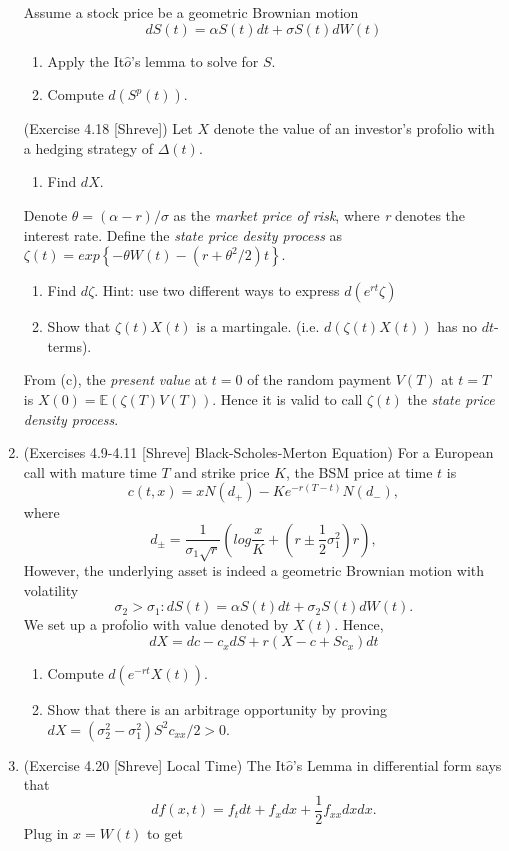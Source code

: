 \documentclass{article}
\begin{document}
\begin{enumerate}
Assume a stock price be a geometric Brownian motion \[dS(t) = \alpha S(t)dt + \sigma S(t)dW(t)\] 
\begin{enumerate}
\item Apply the It$\hat o$'s lemma to solve for $S$.
\item Compute $d(S^p(t))$.
\end{enumerate}
(Exercise 4.18 [Shreve]) Let $X$ denote the value of an investor's profolio with a hedging strategy of $\Delta(t)$.
\begin{enumerate}
\addtocounter{enumii}{2}
\item Find $dX$.
\end{enumerate}
Denote $\theta = (\alpha-r)/\sigma$ as the \emph{market price of risk}, where \emph{r} denotes the interest rate. Define the \emph{state price desity process} as 
$\zeta(t) = exp\left\{ -\theta W(t) - \left(r+ \theta^2/2\right)t \right\}$. 
\begin{enumerate}
\addtocounter{enumii}{3}
\item Find $d\zeta$. Hint: use two different ways to express
$d(e^{rt}\zeta)$
\item Show that $\zeta(t)X(t)$ is a martingale. (i.e. $d(\zeta(t)X(t))$ has no $dt$-terms). 
\end{enumerate}
From (c), the \emph{present value} at $t=0$ of the random payment $V(T)$ at $t=T$ is $X(0)=\mathbb E(\zeta(T)V(T))$. Hence it is valid to call $\zeta(t)$ the \emph{state price density process}.
\item (Exercises 4.9-4.11 [Shreve] Black-Scholes-Merton Equation)
For a European call with mature time $T$ and strike price $K$, the BSM price at time $t$ is 
\[
c(t,x)=xN(d_+)-Ke^{-r(T-t)}N(d_-),
\]
where
\[
d_{\pm} = \frac1{\sigma_1\sqrt{r}} \left( log\frac xK + (r\pm\frac12\sigma_1^2)r\right),
\]
However, the underlying asset is indeed a geometric Brownian motion with volatility 
\[\sigma_2>\sigma_1: dS(t)=\alpha S(t)dt + \sigma_2S(t)dW(t).\]
We set up a profolio with value denoted by $X(t)$. Hence, 
\[
dX = dc - c_xdS + r(X-c+Sc_x)dt
\]
\begin{enumerate}
\item Compute $d(e^{-rt}X(t))$.
\item Show that there is an arbitrage opportunity by proving $dX = (\sigma_2^2-\sigma_1^2)S^2c_{xx}/2>0$.
\end{enumerate}
\item (Exercise 4.20 [Shreve] Local Time)
The It$\hat o$'s Lemma in differential form says that \[df(x,t)=f_tdt+f_xdx+\frac12f_{xx}dxdx.\] Plug in $x=W(t)$ to get 

\end{enumerate}
\end{document}
